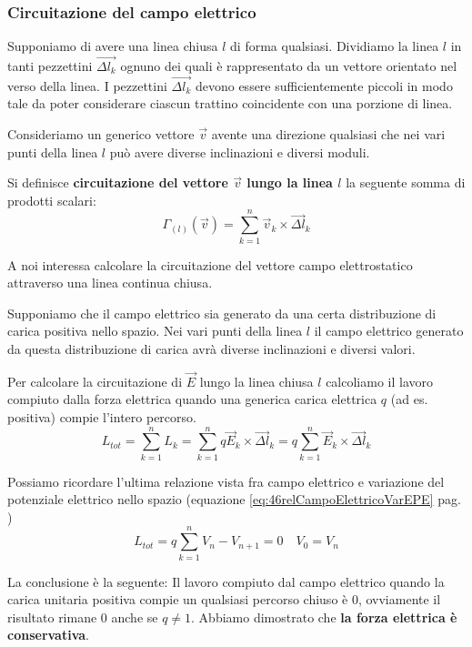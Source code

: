     \subsubsection{Circuitazione del campo elettrico}
        \par Supponiamo di avere una linea chiusa $l$ di forma qualsiasi. Dividiamo la linea $l$ in tanti pezzettini $\overrightarrow{\Delta l_k}$ ognuno dei quali è rappresentato da un vettore orientato nel verso della linea. I pezzettini $\overrightarrow{\Delta l_k}$ devono essere sufficientemente piccoli in modo tale da poter considerare ciascun trattino coincidente con una porzione di linea.
        \par Consideriamo un generico vettore $\vec{v}$ avente una direzione qualsiasi che nei vari punti della linea $l$ può avere diverse inclinazioni e diversi moduli.
        \par Si definisce \textbf{circuitazione del vettore $\vec{v}$ lungo la linea $l$} la seguente somma di prodotti scalari:
        \begin{equation}
            \Gamma_{(l)}(\vec{v})=\sum_{k=1}^{n} \vec{v}_k \times \overrightarrow{\Delta l}_k
        \end{equation}
        \par A noi interessa calcolare la circuitazione del vettore campo elettrostatico attraverso una linea continua chiusa.
        \par Supponiamo che il campo elettrico sia generato da una certa distribuzione di carica positiva nello spazio. Nei vari punti della linea $l$ il campo elettrico generato da questa distribuzione di carica avrà diverse inclinazioni e diversi valori.
        \par Per calcolare la circuitazione di $\vec{E}$ lungo la linea chiusa $l$ calcoliamo il lavoro compiuto dalla forza elettrica quando una generica carica elettrica $q$ (ad es. positiva) compie l'intero percorso.
        \begin{equation*}
            L_{tot}=\sum_{k=1}^n L_k=\sum_{k=1}^n q\vec{E}_k \times \overrightarrow{\Delta l}_k =q\sum_{k=1}^n \vec{E}_k \times \overrightarrow{\Delta l}_k
        \end{equation*}
        \par Possiamo ricordare l'ultima relazione vista fra campo elettrico e variazione del potenziale elettrico nello spazio (equazione \ref{eq:46relCampoElettricoVarEPE} pag. \pageref{eq:46relCampoElettricoVarEPE})
        \begin{equation}\label{eq:46Circuitazione}
            L_{tot}=q\sum_{k=1}^n V_n-V_{n+1} = 0 \enspace \enspace V_0=V_n
        \end{equation}
        \par La conclusione è la seguente: Il lavoro compiuto dal campo elettrico quando la carica unitaria positiva compie un qualsiasi percorso chiuso è 0, ovviamente il risultato rimane 0 anche se $q\neq1$. Abbiamo dimostrato che \textbf{la forza elettrica è conservativa}.
